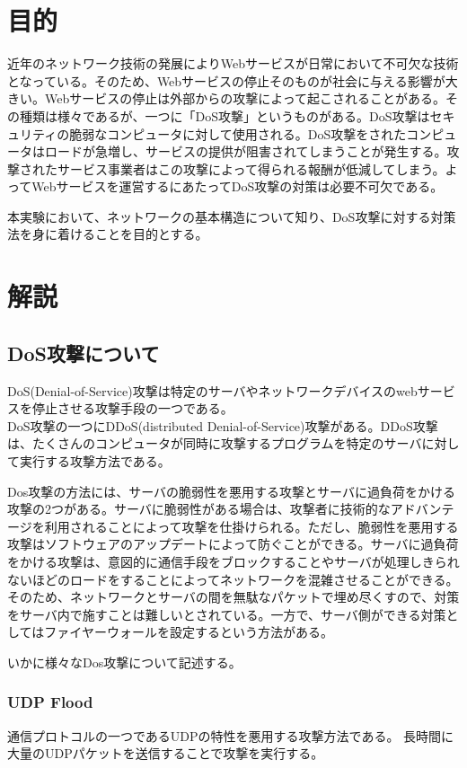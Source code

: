 \documentclass[dvipdfmx]{jsarticle}
\begin{document}
\newpage

\section{目的}
近年のネットワーク技術の発展によりWebサービスが日常において不可欠な技術となっている。そのため、Webサービスの停止そのものが社会に与える影響が大きい。Webサービスの停止は外部からの攻撃によって起こされることがある。その種類は様々であるが、一つに「DoS攻撃」というものがある。DoS攻撃はセキュリティの脆弱なコンピュータに対して使用される。DoS攻撃をされたコンピュータはロードが急増し、サービスの提供が阻害されてしまうことが発生する。攻撃されたサービス事業者はこの攻撃によって得られる報酬が低減してしまう。よってWebサービスを運営するにあたってDoS攻撃の対策は必要不可欠である。

本実験において、ネットワークの基本構造について知り、DoS攻撃に対する対策法を身に着けることを目的とする。

\section{解説}
\subsection{DoS攻撃について}
DoS(Denial-of-Service)攻撃は特定のサーバやネットワークデバイスのwebサービスを停止させる攻撃手段の一つである。\\
DoS攻撃の一つにDDoS(distributed Denial-of-Service)攻撃がある。DDoS攻撃は、たくさんのコンピュータが同時に攻撃するプログラムを特定のサーバに対して実行する攻撃方法である。

Dos攻撃の方法には、サーバの脆弱性を悪用する攻撃とサーバに過負荷をかける攻撃の2つがある。サーバに脆弱性がある場合は、攻撃者に技術的なアドバンテージを利用されることによって攻撃を仕掛けられる。ただし、脆弱性を悪用する攻撃はソフトウェアのアップデートによって防ぐことができる。サーバに過負荷をかける攻撃は、意図的に通信手段をブロックすることやサーバが処理しきられないほどのロードをすることによってネットワークを混雑させることができる。そのため、ネットワークとサーバの間を無駄なパケットで埋め尽くすので、対策をサーバ内で施すことは難しいとされている。一方で、サーバ側ができる対策としてはファイヤーウォールを設定するという方法がある。

いかに様々なDos攻撃について記述する。

\subsubsection{UDP Flood}
通信プロトコルの一つであるUDPの特性を悪用する攻撃方法である。
長時間に大量のUDPパケットを送信することで攻撃を実行する。
\end{document}
